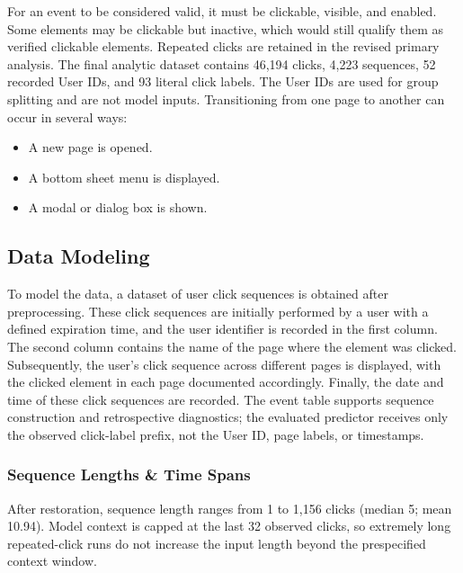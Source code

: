 \documentclass[sn-mathphys-num, Numbered]{sn-jnl}%
\theoremstyle{thmstyleone}%
\theoremstyle{thmstyletwo}%
\theoremstyle{thmstylethree}%
\begin{document}
For an event to be considered valid, it must be clickable, visible, and enabled. Some elements may be clickable but inactive, which would still qualify them as verified clickable elements.
Repeated clicks are retained in the revised primary analysis. The final analytic dataset contains 46,194 clicks, 4,223 sequences, 52 recorded User IDs, and 93 literal click labels. The User IDs are used for group splitting and are not model inputs.
Transitioning from one page to another can occur in several ways:
\begin{itemize}
	\item 
	A new page is opened.
	\item 
	A bottom sheet menu is displayed.
	\item 
	A modal or dialog box is shown.
\end{itemize}




\subsection{Data Modeling}
To model the data, a dataset of user click sequences is obtained after preprocessing. These click sequences are initially performed by a user with a defined expiration time, and the user identifier is recorded in the first column. The second column contains the name of the page where the element was clicked. Subsequently, the user's click sequence across different pages is displayed, with the clicked element in each page documented accordingly. Finally, the date and time of these click sequences are recorded. The event table supports sequence construction and retrospective diagnostics; the evaluated predictor receives only the observed click-label prefix, not the User ID, page labels, or timestamps.

\subsubsection{Sequence Lengths \& Time Spans} 
After restoration, sequence length ranges from 1 to 1,156 clicks (median 5; mean 10.94). Model context is capped at the last 32 observed clicks, so extremely long repeated-click runs do not increase the input length beyond the prespecified context window.
\end{document}

